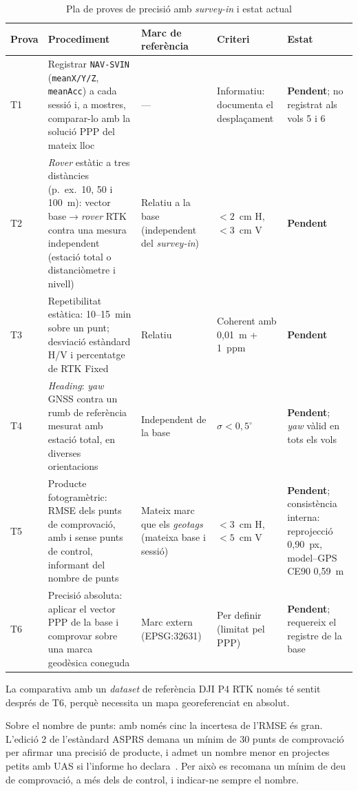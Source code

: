 \begin{table}[H]
    \centering
    \caption{Pla de proves de precisió amb \emph{survey-in} i estat actual}
    \label{tab:validacio}
    \footnotesize
    \begin{tabular}{P{0.8cm}P{4.9cm}P{2.8cm}P{2.6cm}P{2.4cm}}
        \toprule
        Prova & Procediment & Marc de referència & Criteri & Estat \\
        \midrule
        T1 & Registrar \texttt{NAV-SVIN} (\texttt{meanX/Y/Z}, \texttt{meanAcc}) a cada sessió i, a mostres, comparar-lo amb la solució PPP del mateix lloc & --- & Informatiu: documenta el desplaçament & \textbf{Pendent}; no registrat als vols 5 i 6 \\
        T2 & \emph{Rover} estàtic a tres distàncies (p.~ex.\ 10, 50 i 100~m): vector base$\rightarrow$\emph{rover} RTK contra una mesura independent (estació total o distanciòmetre i nivell) & Relatiu a la base (independent del \emph{survey-in}) & $< 2$~cm H, $< 3$~cm V & \textbf{Pendent} \\
        T3 & Repetibilitat estàtica: 10--15~min sobre un punt; desviació estàndard H/V i percentatge de RTK Fixed & Relatiu & Coherent amb 0,01~m + 1~ppm & \textbf{Pendent} \\
        T4 & \emph{Heading}: \emph{yaw} GNSS contra un rumb de referència mesurat amb estació total, en diverses orientacions & Independent de la base & $\sigma < 0{,}5^{\circ}$ & \textbf{Pendent}; \emph{yaw} vàlid en tots els vols \\
        T5 & Producte fotogramètric: RMSE dels punts de comprovació, amb i sense punts de control, informant del nombre de punts & Mateix marc que els \emph{geotags} (mateixa base i sessió) & $< 3$~cm H, $< 5$~cm V & \textbf{Pendent}; consistència interna: reprojecció 0,90~px, model--GPS CE90 0,59~m \\
        T6 & Precisió absoluta: aplicar el vector PPP de la base i comprovar sobre una marca geodèsica coneguda & Marc extern (EPSG:32631) & Per definir (limitat pel PPP) & \textbf{Pendent}; requereix el registre de la base \\
        \bottomrule
    \end{tabular}
\end{table}

La comparativa amb un \emph{dataset} de referència DJI P4 RTK només té sentit després de T6, perquè necessita un mapa georeferenciat en absolut.

Sobre el nombre de punts: amb només cinc la incertesa de l'RMSE és gran. L'edició 2 de l'estàndard ASPRS demana un mínim de 30 punts de comprovació per afirmar una precisió de producte, i admet un nombre menor en projectes petits amb UAS si l'informe ho declara~\cite{asprs2023}. Per això es recomana un mínim de deu de comprovació, a més dels de control, i indicar-ne sempre el nombre.

